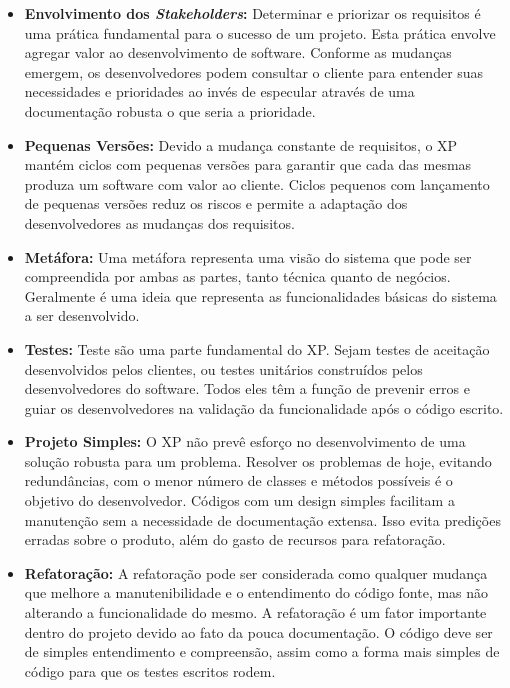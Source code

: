 \begin{itemize}

	\item \textbf{Envolvimento dos \textit{Stakeholders}:} Determinar e priorizar os requisitos é uma prática fundamental para o sucesso de um projeto.  Esta prática envolve agregar valor ao desenvolvimento de software. Conforme as mudanças emergem, os desenvolvedores podem consultar o cliente para entender suas necessidades e prioridades ao invés de especular através de uma documentação robusta o que seria a prioridade.

	\item \textbf{Pequenas Versões:} Devido a mudança constante de requisitos, o XP mantém ciclos com pequenas versões para garantir que cada das mesmas produza um software com valor ao cliente. Ciclos pequenos com lançamento de pequenas versões reduz os riscos e permite a adaptação dos desenvolvedores as mudanças dos requisitos.

	\item \textbf{Metáfora:} Uma metáfora representa uma visão do sistema que pode ser compreendida por ambas as partes, tanto técnica quanto de negócios. Geralmente é uma ideia que representa as funcionalidades básicas do sistema a ser desenvolvido.

	\item \textbf{Testes:} Teste são uma parte fundamental do XP. Sejam testes de aceitação desenvolvidos pelos clientes, ou testes unitários construídos pelos desenvolvedores do software. Todos eles têm a função de prevenir erros e guiar os desenvolvedores  na validação da funcionalidade após o código escrito.

	\item \textbf{Projeto Simples:} O XP não prevê esforço no desenvolvimento de uma solução robusta para um problema. Resolver os problemas de hoje, evitando redundâncias, com o menor número de classes e métodos possíveis é o objetivo do desenvolvedor. Códigos com um design simples facilitam a manutenção sem a necessidade de documentação extensa. Isso evita predições erradas sobre o produto, além do gasto de recursos para refatoração.

	\item \textbf{Refatoração:} A refatoração pode ser considerada como qualquer mudança que melhore a manutenibilidade e o entendimento do código fonte, mas não alterando a funcionalidade do mesmo. \cite{Fowler:1999} A refatoração é um fator importante dentro do projeto devido ao fato da pouca documentação. O código deve ser de simples entendimento e compreensão, assim como a forma mais simples de código para que os testes escritos rodem.


\end{itemize}
